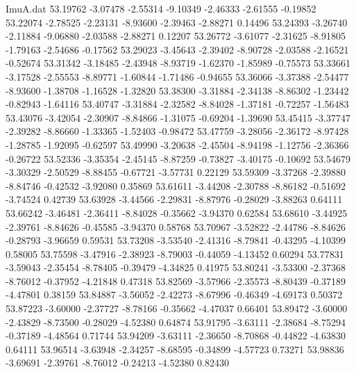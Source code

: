 \begin{filecontents}{ImuA.dat}
  53.19762   -3.07478   -2.55314   -9.10349   -2.46333   -2.61555   -0.19852
  53.22074   -2.78525   -2.23131   -8.93600   -2.39463   -2.88271    0.14496
  53.24393   -3.26740   -2.11884   -9.06880   -2.03588   -2.88271    0.12207
  53.26772   -3.61077   -2.31625   -8.91805   -1.79163   -2.54686   -0.17562
  53.29023   -3.45643   -2.39402   -8.90728   -2.03588   -2.16521   -0.52674
  53.31342   -3.18485   -2.43948   -8.93719   -1.62370   -1.85989   -0.75573
  53.33661   -3.17528   -2.55553   -8.89771   -1.60844   -1.71486   -0.94655
  53.36066   -3.37388   -2.54477   -8.93600   -1.38708   -1.16528   -1.32820
  53.38300   -3.31884   -2.34138   -8.86302   -1.23442   -0.82943   -1.64116
  53.40747   -3.31884   -2.32582   -8.84028   -1.37181   -0.72257   -1.56483
  53.43076   -3.42054   -2.30907   -8.84866   -1.31075   -0.69204   -1.39690
  53.45415   -3.37747   -2.39282   -8.86660   -1.33365   -1.52403   -0.98472
  53.47759   -3.28056   -2.36172   -8.97428   -1.28785   -1.92095   -0.62597
  53.49990   -3.20638   -2.45504   -8.94198   -1.12756   -2.36366   -0.26722
  53.52336   -3.35354   -2.45145   -8.87259   -0.73827   -3.40175   -0.10692
  53.54679   -3.30329   -2.50529   -8.88455   -0.67721   -3.57731    0.22129
  53.59309   -3.37268   -2.39880   -8.84746   -0.42532   -3.92080    0.35869
  53.61611   -3.44208   -2.30788   -8.86182   -0.51692   -3.74524    0.42739
  53.63928   -3.44566   -2.29831   -8.87976   -0.28029   -3.88263    0.64111
  53.66242   -3.46481   -2.36411   -8.84028   -0.35662   -3.94370    0.62584
  53.68610   -3.44925   -2.39761   -8.84626   -0.45585   -3.94370    0.58768
  53.70967   -3.52822   -2.44786   -8.84626   -0.28793   -3.96659    0.59531
  53.73208   -3.53540   -2.41316   -8.79841   -0.43295   -4.10399    0.58005
  53.75598   -3.47916   -2.38923   -8.79003   -0.44059   -4.13452    0.60294
  53.77831   -3.59043   -2.35454   -8.78405   -0.39479   -4.34825    0.41975
  53.80241   -3.53300   -2.37368   -8.76012   -0.37952   -4.21848    0.47318
  53.82569   -3.57966   -2.35573   -8.80439   -0.37189   -4.47801    0.38159
  53.84887   -3.56052   -2.42273   -8.67996   -0.46349   -4.69173    0.50372
  53.87223   -3.60000   -2.37727   -8.78166   -0.35662   -4.47037    0.66401
  53.89472   -3.60000   -2.43829   -8.73500   -0.28029   -4.52380    0.64874
  53.91795   -3.63111   -2.38684   -8.75294   -0.37189   -4.48564    0.71744
  53.94209   -3.63111   -2.36650   -8.70868   -0.44822   -4.63830    0.64111
  53.96514   -3.63948   -2.34257   -8.68595   -0.34899   -4.57723    0.73271
  53.98836   -3.69691   -2.39761   -8.76012   -0.24213   -4.52380    0.82430

\end{filecontents}
